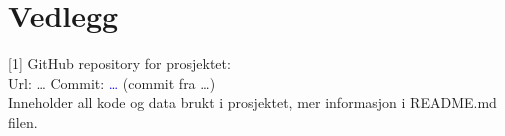 \section*{Vedlegg}\label{vedlegg}
[1] GitHub repository for prosjektet: \\
\indent Url: \dots
\indent Commit: \textcolor{blue}{\dots} (commit fra \dots)\\
\indent Inneholder all kode og data brukt i prosjektet, mer informasjon i README.md filen.


